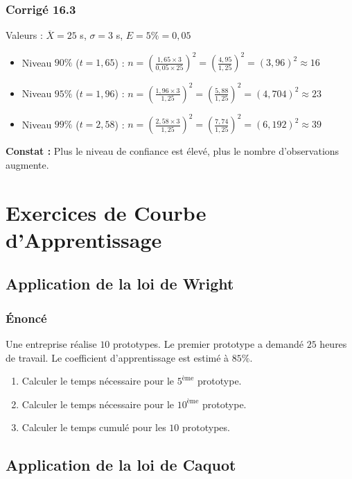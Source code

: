 \documentclass[a4paper,12pt]{article}
\begin{document}
\subsubsection*{Corrigé 16.3}

Valeurs : $\overline{X} = 25$ s, $\sigma = 3$ s, $E = 5\% = 0,05$

\begin{itemize}
    \item Niveau $90\%$ ($t=1,65$) : $n = \left(\frac{1,65 \times 3}{0,05 \times 25}\right)^2 = \left(\frac{4,95}{1,25}\right)^2 = (3,96)^2 \approx 16$
    \item Niveau $95\%$ ($t=1,96$) : $n = \left(\frac{1,96 \times 3}{1,25}\right)^2 = \left(\frac{5,88}{1,25}\right)^2 = (4,704)^2 \approx 23$
    \item Niveau $99\%$ ($t=2,58$) : $n = \left(\frac{2,58 \times 3}{1,25}\right)^2 = \left(\frac{7,74}{1,25}\right)^2 = (6,192)^2 \approx 39$
\end{itemize}

\textbf{Constat :} Plus le niveau de confiance est élevé, plus le nombre d'observations augmente.

\section{Exercices de Courbe d'Apprentissage}

\subsection{Application de la loi de Wright}

\subsubsection*{Énoncé}

Une entreprise réalise $10$ prototypes. Le premier prototype a demandé $25$ heures de travail. Le coefficient d'apprentissage est estimé à $85\%$.

\begin{enumerate}
    \item Calculer le temps nécessaire pour le $5^{\text{ème}}$ prototype.
    \item Calculer le temps nécessaire pour le $10^{\text{ème}}$ prototype.
    \item Calculer le temps cumulé pour les $10$ prototypes.
\end{enumerate}

\subsection{Application de la loi de Caquot}
\end{document}
